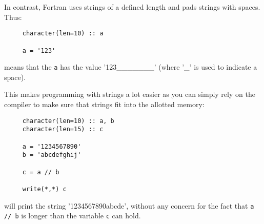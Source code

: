 In contrast, Fortran uses strings of a defined length and pads strings with spaces. Thus:
\begin{verbatim}
     character(len=10) :: a

     a = '123'
\end{verbatim}

\noindent means that the \verb+a+ has the value '123_______' (where '_' is used to indicate a space).

This makes programming with strings a lot easier as you can simply rely on the compiler to make
sure that strings fit into the allotted memory:

\begin{verbatim}
     character(len=10) :: a, b
     character(len=15) :: c

     a = '1234567890'
     b = 'abcdefghij'

     c = a // b

     write(*,*) c
\end{verbatim}

\noindent will print the string '1234567890abcde', without any concern for the fact that \verb+a // b+
is longer than the variable \verb+c+ can hold.
